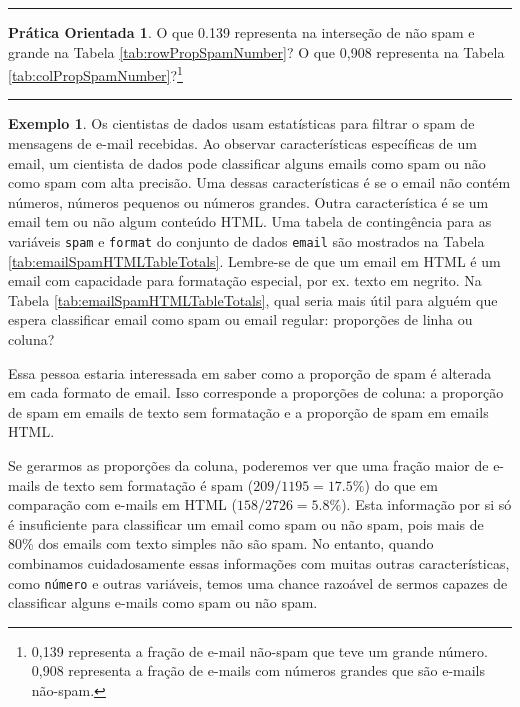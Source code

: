 \documentclass[
]{book}
\theoremstyle{definition}
\theoremstyle{definition}
\newtheorem{example}{Exemplo}[chapter]
\theoremstyle{definition}
\newtheorem{exercise}{Prática Orientada}[chapter]
\theoremstyle{definition}
\theoremstyle{remark}
\begin{document}
\begin{center}\rule{0.5\linewidth}{0.5pt}\end{center}

\begin{exercise}
\protect\hypertarget{exr:unnamed-chunk-36}{}{\label{exr:unnamed-chunk-36} }O que 0.139 representa na interseção de não spam e grande na Tabela \ref{tab:rowPropSpamNumber}? O que 0,908 representa na Tabela \ref{tab:colPropSpamNumber}?\footnote{0,139 representa a fração de e-mail não-spam que teve um grande número. 0,908 representa a fração de e-mails com números grandes que são e-mails não-spam.}
\end{exercise}

\begin{center}\rule{0.5\linewidth}{0.5pt}\end{center}

\begin{example}
\protect\hypertarget{exm:weighingRowColumnProportions}{}{\label{exm:weighingRowColumnProportions} }Os cientistas de dados usam estatísticas para filtrar o spam de mensagens de e-mail recebidas. Ao observar características específicas de um email, um cientista de dados pode classificar alguns emails como spam ou não como spam com alta precisão. Uma dessas características é se o email não contém números, números pequenos ou números grandes. Outra característica é se um email tem ou não algum conteúdo HTML. Uma tabela de contingência para as variáveis \texttt{spam} e \texttt{format} do conjunto de dados \texttt{email} são mostrados na Tabela \ref{tab:emailSpamHTMLTableTotals}. Lembre-se de que um email em HTML é um email com capacidade para formatação especial, por ex. texto em negrito. Na Tabela \ref{tab:emailSpamHTMLTableTotals}, qual seria mais útil para alguém que espera classificar email como spam ou email regular: proporções de linha ou coluna?
\end{example}

Essa pessoa estaria interessada em saber como a proporção de spam é alterada em cada formato de email. Isso corresponde a proporções de coluna: a proporção de spam em emails de texto sem formatação e a proporção de spam em emails HTML.

Se gerarmos as proporções da coluna, poderemos ver que uma fração maior de e-mails de texto sem formatação é spam (\(209/1195 = 17.5\%\)) do que em comparação com e-mails em HTML (\(158/2726 = 5.8\%\)). Esta informação por si só é insuficiente para classificar um email como spam ou não spam, pois mais de 80\% dos emails com texto simples não são spam. No entanto, quando combinamos cuidadosamente essas informações com muitas outras características, como \texttt{número} e outras variáveis, temos uma chance razoável de sermos capazes de classificar alguns e-mails como spam ou não spam.
\end{document}
